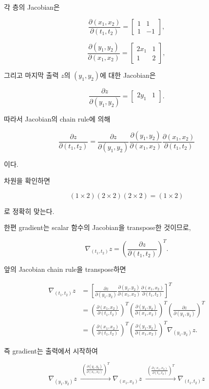 \documentclass[11pt,a4paper]{article}
\begin{document}
각 층의 Jacobian은

\[
\frac{\partial(x_1,x_2)}
     {\partial(t_1,t_2)}
=
\begin{bmatrix}
1&1\\
1&-1
\end{bmatrix},
\]

\[
\frac{\partial(y_1,y_2)}
     {\partial(x_1,x_2)}
=
\begin{bmatrix}
2x_1&1\\
1&2
\end{bmatrix},
\]

그리고 마지막 출력 $z$의 $(y_1,y_2)$에 대한 Jacobian은

\[
\frac{\partial z}{\partial(y_1,y_2)}
=
\begin{bmatrix}
2y_1&1
\end{bmatrix}.
\]

따라서 Jacobian의 chain rule에 의해

\[
\boxed{
\frac{\partial z}{\partial(t_1,t_2)}
=
\frac{\partial z}{\partial(y_1,y_2)}
\frac{\partial(y_1,y_2)}{\partial(x_1,x_2)}
\frac{\partial(x_1,x_2)}{\partial(t_1,t_2)}
}
\]

이다.

차원을 확인하면

\[
(1\times2)(2\times2)(2\times2)
=
(1\times2)
\]

로 정확히 맞는다.


한편 gradient는 scalar 함수의 Jacobian을 transpose한 것이므로,

\[
\nabla_{(t_1,t_2)}z
=
\left(
\frac{\partial z}{\partial(t_1,t_2)}
\right)^T.
\]

앞의 Jacobian chain rule을 transpose하면

\[
\begin{aligned}
\nabla_{(t_1,t_2)}z
&=
\left[
\frac{\partial z}{\partial(y_1,y_2)}
\frac{\partial(y_1,y_2)}{\partial(x_1,x_2)}
\frac{\partial(x_1,x_2)}{\partial(t_1,t_2)}
\right]^T
\\[0.5em]
&=
\left(
\frac{\partial(x_1,x_2)}{\partial(t_1,t_2)}
\right)^T
\left(
\frac{\partial(y_1,y_2)}{\partial(x_1,x_2)}
\right)^T
\left(
\frac{\partial z}{\partial(y_1,y_2)}
\right)^T
\\[0.5em]
&=
\left(
\frac{\partial(x_1,x_2)}{\partial(t_1,t_2)}
\right)^T
\left(
\frac{\partial(y_1,y_2)}{\partial(x_1,x_2)}
\right)^T
\nabla_{(y_1,y_2)}z.
\end{aligned}
\]

즉 gradient는 출력에서 시작하여

\[
\boxed{
\nabla_{(y_1,y_2)}z
\;\xrightarrow{\;
\left(\frac{\partial(y_1,y_2)}{\partial(x_1,x_2)}\right)^T
\;}
\nabla_{(x_1,x_2)}z
\;\xrightarrow{\;
\left(\frac{\partial(x_1,x_2)}{\partial(t_1,t_2)}\right)^T
\;}
\nabla_{(t_1,t_2)}z
}
\]
\end{document}
